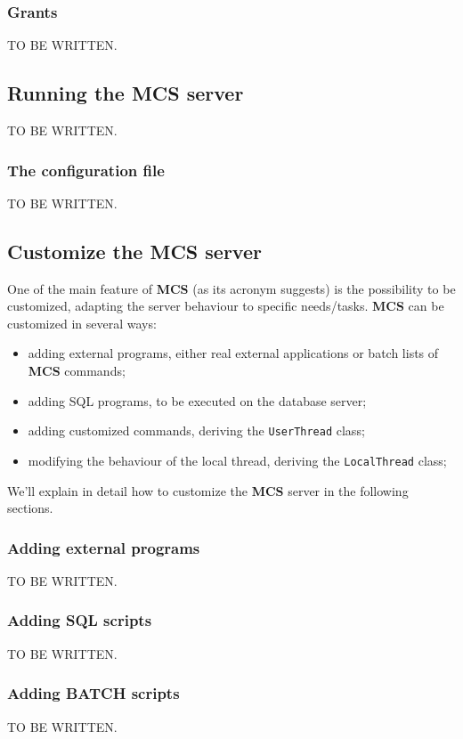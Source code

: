 \documentclass[12pt,titlepage]{article}
\newcommand{\mcs}{\textbf{MCS} }
\begin{document}
%
\subsubsection{Grants}
TO BE WRITTEN.


%
\subsection{Running the \mcs server}
TO BE WRITTEN.

\subsubsection{The configuration file}
TO BE WRITTEN.


%
\subsection{Customize the \mcs server}
\label{sec:customizemcs}
One of the main feature of \mcs (as its acronym suggests) is the possibility
to be customized, adapting the server behaviour to specific needs/tasks.
\mcs can be customized in several ways:

\begin{itemize}
\item adding external programs, either real external applications or
  batch lists of \mcs commands;
\item adding SQL programs, to be executed on the database server;
\item adding customized commands, deriving the \verb|UserThread|
  class;
\item modifying the behaviour of the local thread, deriving the
  \verb|LocalThread| class;
\end{itemize}

We'll explain in detail how to customize the \mcs server in the following
sections.

\subsubsection{Adding external programs}
TO BE WRITTEN.

\subsubsection{Adding SQL scripts}
TO BE WRITTEN.

\subsubsection{Adding BATCH scripts}
TO BE WRITTEN.
\end{document}
